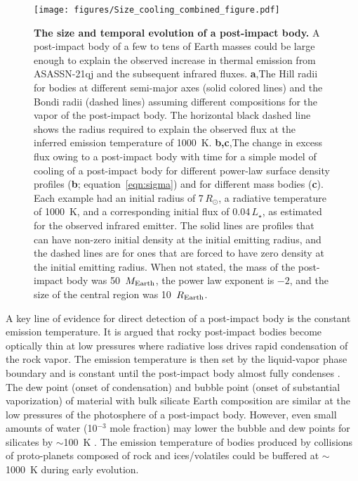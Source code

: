 \documentclass[sn-nature,oneside]{sn-jnl}%
\begin{document}
\begin{figure}
\centering
\texttt{[image: figures/Size\_cooling\_combined\_figure.pdf]}\caption{\textbf{The size and temporal evolution of a post-impact body.}
%
A post-impact body of a few to tens of Earth masses could be large enough to explain the observed increase in thermal emission from ASASSN-21qj and the subsequent infrared fluxes.
%
{\bf a},The Hill radii for bodies at different semi-major axes (solid colored lines) and the Bondi radii (dashed lines) assuming different compositions for the vapor of the post-impact body.
%
The horizontal black dashed line shows the radius required to explain the observed flux at the inferred emission temperature of 1000~K. 
%
{\bf b,c},The change in excess flux owing to a post-impact body with time for a simple model of cooling of a post-impact body for different power-law surface density profiles ({\bf b}; equation~\ref{eqn:sigma}) and for different mass bodies ({\bf c}).
%
Each example had an initial radius of 7\,$R_\odot$, a radiative temperature of 1000~K, and a corresponding initial flux of 0.04\,$L_\star$, as estimated for the observed infrared emitter.
%
The solid lines are profiles that can have non-zero initial density at the initial emitting radius, and the dashed lines are for ones that are forced to have zero density at the initial emitting radius.
%
When not stated, the mass of the post-impact body was 50~$M_{\rm Earth}$, the power law exponent is $-2$, and the size of the central region was 10~$R_{\rm Earth}$.
}
\label{fig:Hill_Bondi_R}
\end{figure}


A key line of evidence for direct detection of a post-impact body is the constant emission temperature.
%
It is argued \cite{Lock18} that rocky post-impact bodies become optically thin at low pressures where radiative loss drives rapid condensation of the rock vapor.
%
The emission temperature is then set by the liquid-vapor phase boundary and is constant until the post-impact body almost fully condenses \cite{Lock18,Caracas2023}.
%
The dew point (onset of condensation) and bubble point (onset of substantial vaporization) of material with bulk silicate Earth composition are similar \cite[$\sim2300$~K, within $\sim 100$~K;][]{Lock18,Fegley2023_BSE_cond} at the low pressures of the photosphere of a post-impact body.
%
However, even small amounts of water (10$^{-3}$ mole fraction) may lower the bubble and dew points for silicates by $\sim$100~K \cite[][]{Fegley2023_BSE_cond,Lock18}. 
%
The emission temperature of bodies produced by collisions of proto-planets composed of rock and ices/volatiles could be buffered at $\sim$1000~K during early evolution.
\end{document}
